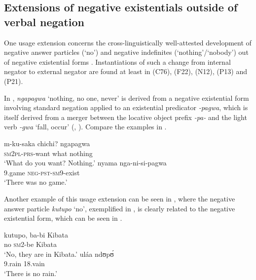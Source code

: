 \documentclass[output=paper,draft,draftmode,colorlinks,citecolor=brown]{langscibook}
\begin{document}
\subsection{Extensions of negative existentials outside of verbal
negation}\label{sec:1:6.1}
%
One usage extension concerns the cross-linguistically well-attested
development of negative answer particles (`no') and negative indefinites
(`no\-thing'\slash `no\-bo\-dy') out of negative existential forms
\parencites(see)()
{Schwegler1988}{Croft1991}{Veselinova2013}{Veselinova2014}{Veselinova2016}.
Instantiations of such a change from internal negator to external negator
are found at least in  (C76),  (F22), 
(N12),  (P13) and  (P21).

In , \textit{ngapagwa} `nothing, no one, never' is derived from a
negative existential form involving standard negation applied to an
existential predicator \textit{-pagwa}, which is itself derived from a
merger between the locative object prefix \textit{-pa-} and the light verb
\textit{-gwa} `fall, occur' (\citealt[72]{Sanderson1922},
\citealt[174]{Whiteley1966}). Compare the examples in
.
%

\ea\label{ex:yao-want-game}

\ea\gll m-ku-saka chichi? ngapagwa\\
\textsc{sm2pl-prs}-want what nothing\\
\glt 	`What do you want?
Nothing.'
\ex\gll nyama nga-ni-si-pagwa\\ 9.game
\textsc{neg-pst-sm}9-exist\\
\glt 	`There was no game.'
\z
\z


%
Another
example of this usage extension can be seen in , where the
negative answer particle \textit{kutupo} `no', exemplified in
, is clearly related to the negative existential
form, which can be seen in .

\ea\label{ex:matumbi-kibata-rain} 

\ea\label{ex:matumbi-kibata}
\gll kutupo, ba-bi Kibata\\ no \textsc{sm}2-be
Kibata\\
\glt 	`No, they are in Kibata.'
\ex\label{ex:matumbi-rain}
\gll
uláa ndʊp{\'ʊ}\\ 9.rain 18.vain\\
\glt 	`There is no rain.'
\z
\z
\end{document}
